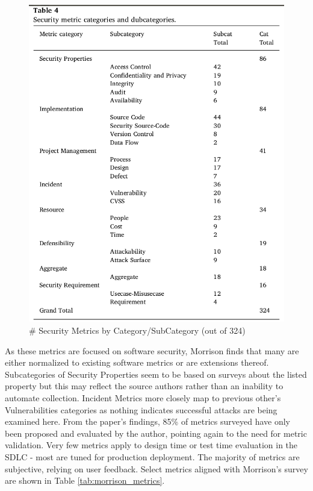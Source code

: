 \begin{figure}[ht]
\centering
\includegraphics[width=.55\linewidth]{resource/img/ch_background/cybok_metrics/morrison_metric_props_table.png}
\caption{\# Security Metrics by Category/SubCategory (out of 324)\cite{Morrison_Moye_Pandita_Williams_2018}
\label{fig:background:morrison_metric_props}}
\end{figure} 

As these metrics are focused on software security, Morrison finds that many are either normalized to existing software metrics or are extensions thereof. Subcategories of Security Properties seem to be based on surveys about the listed property but this may reflect the source authors rather than an inability to automate collection. Incident Metrics more closely map to previous other’s Vulnerabilities categories as nothing indicates successful attacks are being examined here. 
From the paper’s findings, 85\% of metrics surveyed have only been proposed and evaluated by the author, pointing again to the need for metric validation. Very few metrics apply to design time or test time evaluation in the SDLC - most are tuned for production deployment. The majority of metrics are subjective, relying on user feedback. Select metrics aligned with Morrison's survey are shown in Table \ref{tab:morrison_metrics}.

